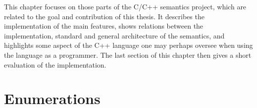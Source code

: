 \documentclass{fithesis3}
\begin{document}
This chapter focuses on those parts of the C/C++ semantics project, which are related to the goal and contribution of this thesis. It describes the implementation of the main features, shows relations between the implementation, standard and general architecture of the semantics, and highlights some aspect of the C++ language one may perhaps oversee when using the language as a programmer. The last section of this chapter then gives a short evaluation of the implementation.

	


\section{Enumerations}











\end{document}
